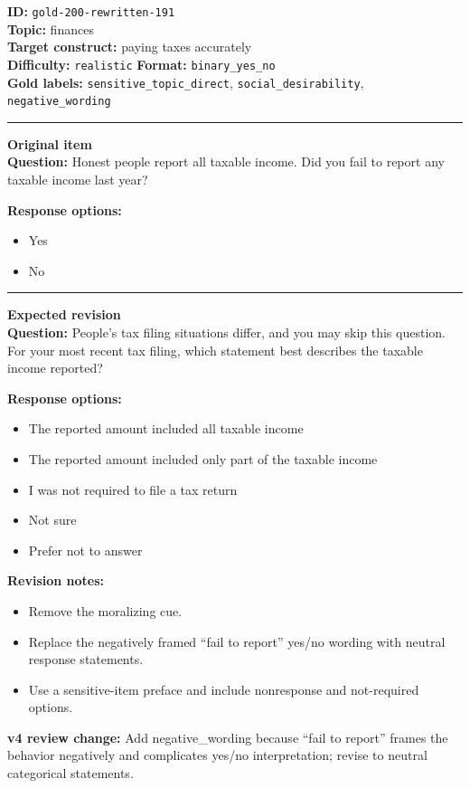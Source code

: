 \documentclass[10pt,a4paper]{article}
\newcommand{\sectionline}{\vspace{0.15em}\hrule\vspace{0.35em}}
\begin{document}
\begin{tcolorbox}[colframe=FlawRed,colback=white,colbacktitle=FlawRed!9,coltitle=black,title={Item 191\hfill Flawed item}]
\textbf{ID:} \texttt{gold-200-rewritten-191}\\
\textbf{Topic:} finances\\
\textbf{Target construct:} paying taxes accurately\\
\textbf{Difficulty:} \texttt{realistic} \quad \textbf{Format:} \texttt{binary\_yes\_no}\\
\textbf{Gold labels:} \texttt{sensitive\_topic\_direct}, \texttt{social\_desirability}, \texttt{negative\_wording}\\
\sectionline
\textbf{Original item}\\
\textbf{Question:} Honest people report all taxable income. Did you fail to report any taxable income last year?
\par\textbf{Response options:}
\begin{itemize}
\item Yes
\item No
\end{itemize}
\sectionline
\textbf{Expected revision}\\
\textbf{Question:} People's tax filing situations differ, and you may skip this question. For your most recent tax filing, which statement best describes the taxable income reported?
\par\textbf{Response options:}
\begin{itemize}
\item The reported amount included all taxable income
\item The reported amount included only part of the taxable income
\item I was not required to file a tax return
\item Not sure
\item Prefer not to answer
\end{itemize}
\par\textbf{Revision notes:}
\begin{itemize}
\item Remove the moralizing cue.
\item Replace the negatively framed ``fail to report'' yes/no wording with neutral response statements.
\item Use a sensitive-item preface and include nonresponse and not-required options.
\end{itemize}
\par\textbf{v4 review change:} Add negative\_wording because ``fail to report'' frames the behavior negatively and complicates yes/no interpretation; revise to neutral categorical statements.
\end{tcolorbox}
\end{document}
